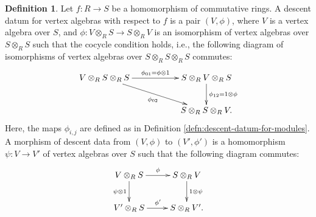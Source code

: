 \documentclass[11pt]{article}
\theoremstyle{definition}
\newtheorem{defn}[thm]{Definition}
\begin{document}
\begin{defn}
Let $f\colon R \to S$ be a homomorphism of commutative rings. A descent datum for vertex algebras with respect to $f$ is a pair $(V,\phi)$, where $V$ is a vertex algebra over $S$, and $\phi\colon V \otimes_{R} S \to S \otimes_{R} V$ is an isomorphism of vertex algebras over $S \otimes_{R} S$ such that the cocycle condition holds, i.e., the following diagram of isomorphisms of vertex algebras over $S \otimes_{R} S \otimes_{R} S$ commutes:
\begin{gather*} \xymatrix{ V \otimes_{R} S \otimes_{R} S \ar[rr]^{\phi_{01} = \phi \otimes 1} \ar[rrd]_{\phi_{02}} & & S \otimes_{R} V \otimes_{R} S \ar[d]^{\phi_{12} = 1 \otimes \phi} \\ & & S \otimes_{R} S \otimes_{R} V.} \end{gather*}
Here, the maps $\phi_{i,j}$ are defined as in Definition \ref{defn:descent-datum-for-modules}. A morphism of descent data from $(V, \phi)$ to $(V', \phi')$ is a homomorphism $\psi\colon V \to V'$ of vertex algebras over $S$ such that the following diagram commutes:
\begin{gather*} \xymatrix{ V \otimes_{R} S \ar[r]^{\phi} \ar[d]_{\psi \otimes 1} & S \otimes_{R} V \ar[d]^{1 \otimes \psi} \\
V' \otimes_{R} S \ar[r]^{\phi'} & S \otimes_{R} V'. } \end{gather*}
\end{defn}
\end{document}
